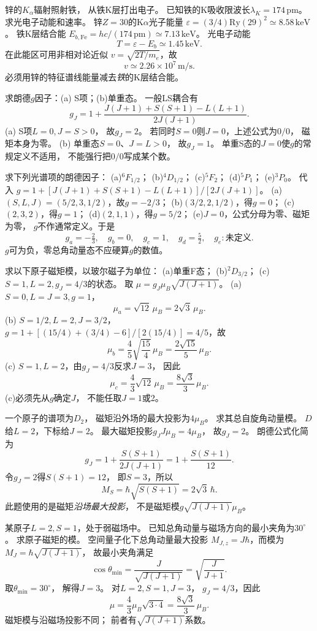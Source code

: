 锌的$K_\alpha$辐射照射铁，
从铁K层打出电子。
已知铁的K吸收限波长$\lambda_K=174\,\mathrm{pm}$。
求光电子动能和速率。
\exsolution
锌$Z=30$的K$\alpha$光子能量
$\varepsilon=(3/4)\mathrm{Ry}(29)^2
\simeq8.58\,\mathrm{keV}$。
铁K层结合能
$E_{b,\mathrm{Fe}}=hc/(174\,\mathrm{pm})
\simeq7.13\,\mathrm{keV}$。
光电子动能
\[
 \boxed{T=\varepsilon-E_b\simeq1.45\,\mathrm{keV}}.
\]
在此能区可用非相对论近似
$v=\sqrt{2T/m_e}$，故
\[
 \boxed{v\simeq2.26\times10^7\,\mathrm{m/s}}.
\]
\excheck 必须用锌的特征谱线能量减去\emph{铁}的K层结合能。

求朗德$g$因子：(a) S项；(b)单重态。
\exsolution
一般LS耦合有
\[
 g_J=1+\frac{J(J+1)+S(S+1)-L(L+1)}
 {2J(J+1)}.
\]
(a) S项$L=0,J=S>0$，
故$\boxed{g_J=2}$。
若同时$S=0$则$J=0$，上述公式为$0/0$，
磁矩本身为零。
(b) 单重态$S=0$、$J=L>0$，
故$\boxed{g_J=1}$。
\excheck 单重S态的$J=0$使$g$的常规定义不适用，
不能强行把$0/0$写成某个数。

求下列光谱项的朗德因子：
(a)\({}^{6}F_{1/2}\)；
(b)\({}^{4}D_{1/2}\)；
(c)\({}^{5}F_2\)；
(d)\({}^{5}P_1\)；
(e)\({}^{3}P_0\)。
\exsolution
代入
$g=1+[J(J+1)+S(S+1)-L(L+1)]/[2J(J+1)]$。
(a)$(S,L,J)=(5/2,3,1/2)$，故$g=-2/3$；
(b)$(3/2,2,1/2)$，得$g=0$；
(c)$(2,3,2)$，得$g=1$；
(d)$(2,1,1)$，得$g=5/2$；
(e)$J=0$，公式分母为零、磁矩为零，
$g$不作通常定义。于是
\[
 \boxed{g_a=-\tfrac23,\quad g_b=0,\quad
 g_c=1,\quad g_d=\tfrac52,\quad g_e:\text{未定义}}.
\]
\excheck $g$可为负，零总角动量态不应硬算$g$的数值。

求以下原子磁矩模，以玻尔磁子为单位：
(a)单重F态；
(b)\({}^{2}D_{3/2}\)；
(c)$S=1,L=2,g_J=4/3$的状态。
\exsolution
取
$\mu=g_J\mu_B\sqrt{J(J+1)}$。
(a) $S=0,L=J=3,g=1$，
\[
 \boxed{\mu_a=\sqrt{12}\,\mu_B=2\sqrt3\,\mu_B}.
\]
(b) $S=1/2,L=2,J=3/2$，
$g=1+[(15/4)+(3/4)-6]/[2(15/4)]=4/5$，故
\[
 \boxed{\mu_b=\frac45\sqrt{\frac{15}4}\,\mu_B
 =\frac{2\sqrt{15}}5\,\mu_B}.
\]
(c) $S=1,L=2$，由$g_J=4/3$反求$J=3$，
因此
\[
 \boxed{\mu_c=\frac43\sqrt{12}\,\mu_B
 =\frac{8\sqrt3}{3}\,\mu_B}.
\]
\excheck (c)必须先从$g$确定$J$，
不能任取$J=1$或2。

一个原子的谱项为$D_2$，
磁矩沿外场的最大投影为$4\mu_B$。
求其总自旋角动量模。
\exsolution
$D$给$L=2$，下标给$J=2$。
最大磁矩投影$g_JJ\mu_B=4\mu_B$，
故$g_J=2$。
朗德公式化简为
\[
 g_J=1+\frac{S(S+1)}{2J(J+1)}
 =1+\frac{S(S+1)}{12}.
\]
令$g_J=2$得$S(S+1)=12$，
即$S=3$，所以
\[
 \boxed{M_S=\hbar\sqrt{S(S+1)}=
 2\sqrt3\,\hbar}.
\]
\excheck 此题使用的是磁矩\emph{沿场最大投影}，
不是磁矩模$g\sqrt{J(J+1)}\mu_B$。

某原子$L=2,S=1$，处于弱磁场中。
已知总角动量与磁场方向的最小夹角为$30^\circ$。
求原子磁矩的模。
\exsolution
空间量子化下总角动量最大投影
$M_{J,z}=J\hbar$，而模为
$M_J=\hbar\sqrt{J(J+1)}$，
故最小夹角满足
\[
 \cos\theta_{\min}=
 \frac J{\sqrt{J(J+1)}}=
 \sqrt{\frac J{J+1}}.
\]
取$\theta_{\min}=30^\circ$，
解得$J=3$。
对$L=2,S=1,J=3$，
$g_J=4/3$，因此
\[
 \boxed{\mu=\frac43\mu_B\sqrt{3\cdot4}
 =\frac{8\sqrt3}{3}\,\mu_B}.
\]
\excheck 磁矩模与沿磁场投影不同；
前者有$\sqrt{J(J+1)}$系数。
